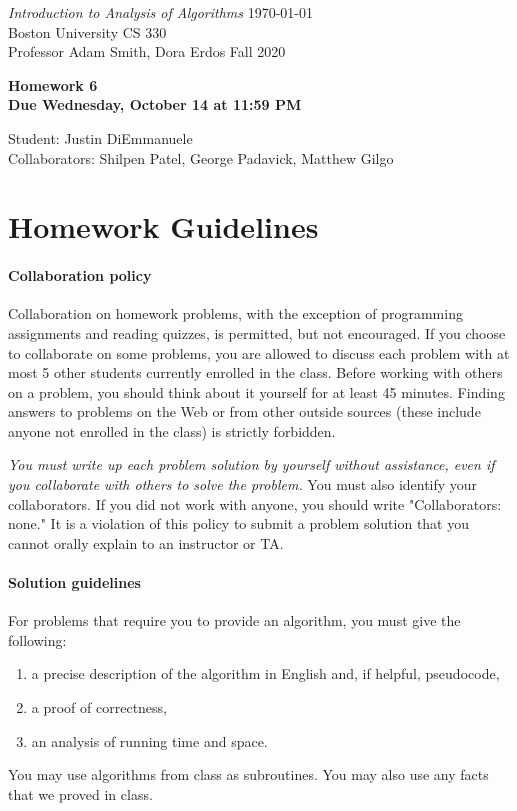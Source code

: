 \documentclass[letterpaper,11pt]{article}
\begin{document}
{\noindent\large
{\em Introduction to Analysis of Algorithms} \hfill \today\\
Boston University \hfill CS 330\\
Professor  Adam Smith, Dora Erdos \hfill Fall 2020\\}
\vspace{1pt}
\hrulefill\vspace{3mm}
\begin{center}
{\LARGE\bf Homework 6}\\
{\bf Due Wednesday, October 14 at 11:59 PM}
\end{center}
\begin{center}
    \color{teal}
   Student: Justin DiEmmanuele \\
    Collaborators: Shilpen Patel, George Padavick, Matthew Gilgo
\end{center}


\section*{Homework Guidelines}

\paragraph{Collaboration policy} Collaboration on homework problems, with the exception of
programming assignments and reading quizzes, is permitted, but not encouraged.
If you
choose to collaborate on some problems, you are allowed to discuss
each problem with at most 5 other students currently enrolled in the
class.
Before working with others on a problem, you should think about it
yourself for at least 45 minutes. Finding answers to problems on the
Web or from other outside sources (these include anyone not enrolled
in the class) is strictly forbidden.

{\em You must write up each problem solution by yourself without
assistance, even if you collaborate with others to solve the
problem.} You must also identify your collaborators. If you did not
work with anyone, you should write "Collaborators: none." It is a
violation of this policy to submit a problem solution that you
cannot orally explain to an instructor or TA.

\paragraph{Solution guidelines} For problems that require you to provide an algorithm, you must give the following:
    \begin{enumerate}
\item  a precise description of the algorithm in English and, if helpful, pseudocode,
\item a proof of correctness,
\item an analysis of running time and space.
\end{enumerate}
You may use algorithms from class as subroutines. You may also use any facts that we proved in class.
\end{document}
